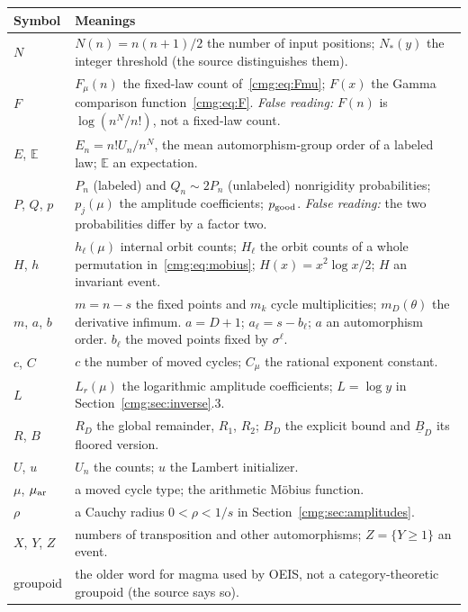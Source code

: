 \documentclass[11pt,letterpaper]{article}
\numberwithin{equation}{section}
\theoremstyle{definition}\newtheorem{definition}[theorem]{Definition}
\theoremstyle{remark}\newtheorem{remark}[theorem]{Remark}
\newcommand{\E}{\mathbb E}\newcommand{\Prob}{\mathbb P}
\begin{document}
\noindent\begin{tabular}{@{}>{\raggedright\arraybackslash}p{0.8in}>{\raggedright\arraybackslash}p{5.4in}@{}}
\toprule
Symbol & Meanings\\
\midrule
$N$ & $N(n)=n(n+1)/2$ the number of input positions; $N_*(y)$ the integer threshold (the source distinguishes them).\\
$F$ & $F_\mu(n)$ the fixed-law count of~\eqref{cmg:eq:Fmu}; $F(x)$ the Gamma comparison function~\eqref{cmg:eq:F}. \emph{False reading:} $F(n)$ is $\log(n^N/n!)$, not a fixed-law count.\\
$E$, $\E$ & $E_n=n!U_n/n^N$, the mean automorphism-group order of a labeled law; $\E$ an expectation.\\
$P$, $Q$, $p$ & $P_n$ (labeled) and $Q_n\sim2P_n$ (unlabeled) nonrigidity probabilities; $p_j(\mu)$ the amplitude coefficients; $p_{\rm good}$. \emph{False reading:} the two probabilities differ by a factor two.\\
$H$, $h$ & $h_\ell(\mu)$ internal orbit counts; $H_\ell$ the orbit counts of a whole permutation in~\eqref{cmg:eq:mobius}; $H(x)=x^2\log x/2$; $H$ an invariant event.\\
$m$, $a$, $b$ & $m=n-s$ the fixed points and $m_k$ cycle multiplicities; $m_D(\theta)$ the derivative infimum. $a=D+1$; $a_\ell=s-b_\ell$; $a$ an automorphism order. $b_\ell$ the moved points fixed by $\sigma^\ell$.\\
$c$, $C$ & $c$ the number of moved cycles; $C_\mu$ the rational exponent constant.\\
$L$ & $L_r(\mu)$ the logarithmic amplitude coefficients; $L=\log y$ in Section~\ref{cmg:sec:inverse}.3.\\
$R$, $B$ & $R_D$ the global remainder, $R_1$, $R_2$; $B_D$ the explicit bound and $\underline B_D$ its floored version.\\
$U$, $u$ & $U_n$ the counts; $u$ the Lambert initializer.\\
$\mu$, $\mu_{\rm ar}$ & a moved cycle type; the arithmetic M\"obius function.\\
$\rho$ & a Cauchy radius $0<\rho<1/s$ in Section~\ref{cmg:sec:amplitudes}.\\
$X$, $Y$, $Z$ & numbers of transposition and other automorphisms; $Z=\{Y\ge1\}$ an event.\\
groupoid & the older word for magma used by OEIS, not a category-theoretic groupoid (the source says so).\\
\bottomrule
\end{tabular}
\endgroup
\end{document}
